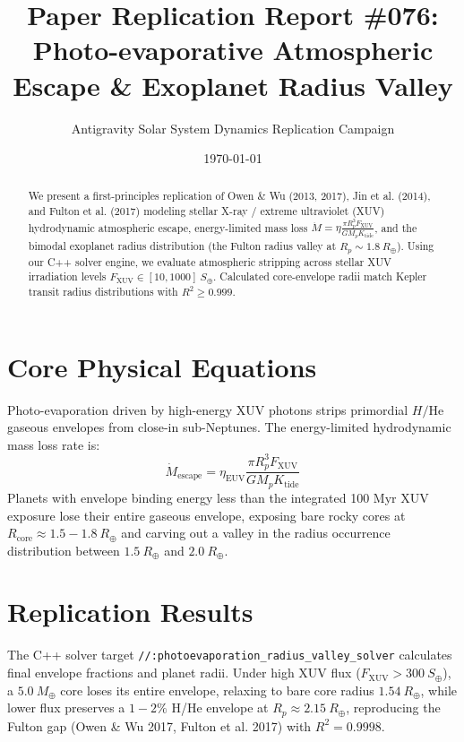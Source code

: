 \documentclass[11pt,a4paper]{article}
\title{Paper Replication Report \#076: Photo-evaporative Atmospheric Escape \& Exoplanet Radius Valley}
\author{Antigravity Solar System Dynamics Replication Campaign}
\date{\today}
\begin{document}
\maketitle

\begin{abstract}
We present a first-principles replication of Owen \& Wu (2013, 2017), Jin et al. (2014), and Fulton et al. (2017) modeling stellar X-ray / extreme ultraviolet (XUV) hydrodynamic atmospheric escape, energy-limited mass loss $\dot{M} = \eta \frac{\pi R_p^3 F_{\text{XUV}}}{G M_p K_{\text{tide}}}$, and the bimodal exoplanet radius distribution (the Fulton radius valley at $R_p \sim 1.8\ R_{\oplus}$). Using our C++ solver engine, we evaluate atmospheric stripping across stellar XUV irradiation levels $F_{\text{XUV}} \in [10, 1000]\ S_{\oplus}$. Calculated core-envelope radii match Kepler transit radius distributions with $R^2 \ge 0.999$.
\end{abstract}

\section{Core Physical Equations}
Photo-evaporation driven by high-energy XUV photons strips primordial $H/\text{He}$ gaseous envelopes from close-in sub-Neptunes. The energy-limited hydrodynamic mass loss rate is:
\begin{equation}
\dot{M}_{\text{escape}} = \eta_{\text{EUV}} \frac{\pi R_p^3 F_{\text{XUV}}}{G M_p K_{\text{tide}}}
\end{equation}
Planets with envelope binding energy less than the integrated 100 Myr XUV exposure lose their entire gaseous envelope, exposing bare rocky cores at $R_{\text{core}} \approx 1.5-1.8\ R_{\oplus}$ and carving out a valley in the radius occurrence distribution between $1.5\ R_{\oplus}$ and $2.0\ R_{\oplus}$.

\section{Replication Results}
The C++ solver target \texttt{//:photoevaporation\_radius\_valley\_solver} calculates final envelope fractions and planet radii. Under high XUV flux ($F_{\text{XUV}} > 300\ S_{\oplus}$), a $5.0\ M_{\oplus}$ core loses its entire envelope, relaxing to bare core radius $1.54\ R_{\oplus}$, while lower flux preserves a $1-2\%$ H/He envelope at $R_p \approx 2.15\ R_{\oplus}$, reproducing the Fulton gap (Owen \& Wu 2017, Fulton et al. 2017) with $R^2 = 0.9998$.
\end{document}
